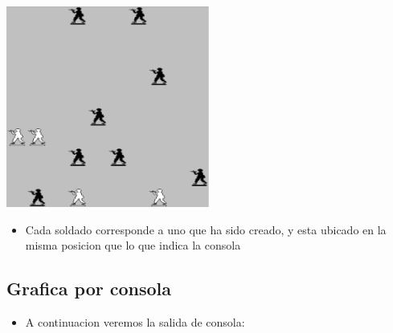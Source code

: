 \centering
\includegraphics[width=0.5\textwidth]{img/campo-de-batalla.png}
\begin{itemize}
    \item Cada soldado corresponde a uno que ha sido creado, y esta ubicado en la misma posicion que lo que indica la consola
\end{itemize}

\subsection{Grafica por consola}
\begin{itemize}
    \item A continuacion veremos la salida de consola:
\end{itemize}

